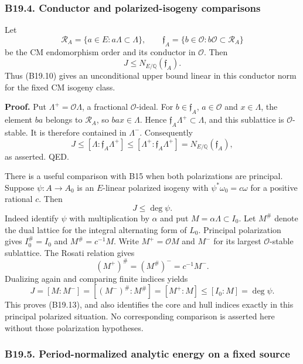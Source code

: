 \documentclass[11pt,a4paper]{article}
\theoremstyle{definition}
\begin{document}
\subsubsection{B19.4. Conductor and polarized-isogeny comparisons}\label{b19.4.-conductor-and-polarized-isogeny-comparisons}

Let \[
 \mathcal R_A=\{a\in E:a\Lambda\subset\Lambda\},\qquad
 \mathfrak f_A=\{b\in\mathcal O:b\mathcal O\subset\mathcal R_A\}
\] be the CM endomorphism order and its conductor in \(\mathcal O\). Then \[
 J\le N_{E/\mathbb Q}(\mathfrak f_A).
\tag{B19.12}
\] Thus (B19.10) gives an unconditional upper bound linear in this conductor norm for the fixed CM isogeny class.

\textbf{Proof.} Put \(\Lambda^+=\mathcal O\Lambda\), a fractional \(\mathcal O\)-ideal. For \(b\in\mathfrak f_A\), \(a\in\mathcal O\) and \(x\in\Lambda\), the element \(ba\) belongs to \(\mathcal R_A\), so \(bax\in\Lambda\). Hence \(\mathfrak f_A\Lambda^+\subset\Lambda\), and this sublattice is \(\mathcal O\)-stable. It is therefore contained in \(\Lambda^-\). Consequently \[
 J\le[\Lambda:\mathfrak f_A\Lambda^+]
 \le[\Lambda^+:\mathfrak f_A\Lambda^+]
 =N_{E/\mathbb Q}(\mathfrak f_A),
\] as asserted. QED.

There is a useful comparison with B15 when both polarizations are principal. Suppose \(\psi:A\to A_0\) is an \(E\)-linear polarized isogeny with \(\psi^*\omega_0=c\omega\) for a positive rational \(c\). Then \[
 J\le\deg\psi.
\tag{B19.13}
\] Indeed identify \(\psi\) with multiplication by \(\alpha\) and put \(M=\alpha\Lambda\subset I_0\). Let \(M^\#\) denote the dual lattice for the integral alternating form of \(L_0\). Principal polarization gives \(I_0^\#=I_0\) and \(M^\#=c^{-1}M\). Write \(M^+=\mathcal O M\) and \(M^-\) for its largest \(\mathcal O\)-stable sublattice. The Rosati relation gives \[
 (M^+)^\#=(M^\#)^-=c^{-1}M^-.
\] Dualizing again and comparing finite indices yields \[
 J=[M:M^-]=[(M^-)^\#:M^\#]
   =[M^+:M]\le[I_0:M]=\deg\psi.
\] This proves (B19.13), and also identifies the core and hull indices exactly in this principal polarized situation. No corresponding comparison is asserted here without those polarization hypotheses.

\subsubsection{B19.5. Period-normalized analytic energy on a fixed source}\label{b19.5.-period-normalized-analytic-energy-on-a-fixed-source}
\end{document}
